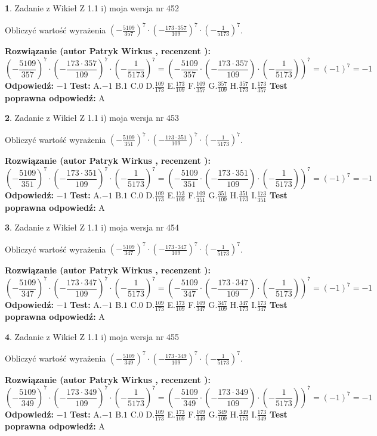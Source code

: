 \documentclass[12pt, a4paper]{article}
\theoremstyle{definition} %
\newtheorem{zad}{}
\newcommand{\zadStart}[1]{\begin{zad}#1\newline}
\newcommand{\zadStop}{\end{zad}}
\newcommand{\rozwStart}[2]{\noindent \textbf{Rozwiązanie (autor #1 , recenzent #2): }\newline}
\newcommand{\rozwStop}{\newline}
\newcommand{\odpStart}{\noindent \textbf{Odpowiedź:}\newline}
\newcommand{\odpStop}{\newline}
\newcommand{\testStart}{\noindent \textbf{Test:}\newline}
\newcommand{\testStop}{\newline}
\newcommand{\kluczStart}{\noindent \textbf{Test poprawna odpowiedź:}\newline}
\newcommand{\kluczStop}{\newline}
\begin{document}
\zadStart{Zadanie z Wikieł Z 1.1 i) moja wersja nr 452}

Obliczyć wartość wyrażenia $(-\frac{5109}{357})^{7} \cdot (-\frac{173 \cdot 357}{109})^{7} \cdot (-\frac{1}{5173})^{7}$.
\zadStop
\rozwStart{Patryk Wirkus}{}
$$(-\frac{5109}{357})^{7} \cdot (-\frac{173 \cdot 357}{109})^{7} \cdot (-\frac{1}{5173})^{7} = (-\frac{5109}{357} \cdot (-\frac{173 \cdot 357}{109}) \cdot (-\frac{1}{5173}))^{7} = (-1)^{7} = -1$$
\rozwStop
\odpStart
$-1$
\odpStop
\testStart
A.$-1$ B.$1$ C.$0$ D.$\frac{109}{173}$ E.$\frac{173}{109}$
F.$\frac{109}{357}$ G.$\frac{357}{109}$
H.$\frac{357}{173}$
I.$\frac{173}{357}$
\testStop
\kluczStart
A
\kluczStop



\zadStart{Zadanie z Wikieł Z 1.1 i) moja wersja nr 453}

Obliczyć wartość wyrażenia $(-\frac{5109}{351})^{7} \cdot (-\frac{173 \cdot 351}{109})^{7} \cdot (-\frac{1}{5173})^{7}$.
\zadStop
\rozwStart{Patryk Wirkus}{}
$$(-\frac{5109}{351})^{7} \cdot (-\frac{173 \cdot 351}{109})^{7} \cdot (-\frac{1}{5173})^{7} = (-\frac{5109}{351} \cdot (-\frac{173 \cdot 351}{109}) \cdot (-\frac{1}{5173}))^{7} = (-1)^{7} = -1$$
\rozwStop
\odpStart
$-1$
\odpStop
\testStart
A.$-1$ B.$1$ C.$0$ D.$\frac{109}{173}$ E.$\frac{173}{109}$
F.$\frac{109}{351}$ G.$\frac{351}{109}$
H.$\frac{351}{173}$
I.$\frac{173}{351}$
\testStop
\kluczStart
A
\kluczStop



\zadStart{Zadanie z Wikieł Z 1.1 i) moja wersja nr 454}

Obliczyć wartość wyrażenia $(-\frac{5109}{347})^{7} \cdot (-\frac{173 \cdot 347}{109})^{7} \cdot (-\frac{1}{5173})^{7}$.
\zadStop
\rozwStart{Patryk Wirkus}{}
$$(-\frac{5109}{347})^{7} \cdot (-\frac{173 \cdot 347}{109})^{7} \cdot (-\frac{1}{5173})^{7} = (-\frac{5109}{347} \cdot (-\frac{173 \cdot 347}{109}) \cdot (-\frac{1}{5173}))^{7} = (-1)^{7} = -1$$
\rozwStop
\odpStart
$-1$
\odpStop
\testStart
A.$-1$ B.$1$ C.$0$ D.$\frac{109}{173}$ E.$\frac{173}{109}$
F.$\frac{109}{347}$ G.$\frac{347}{109}$
H.$\frac{347}{173}$
I.$\frac{173}{347}$
\testStop
\kluczStart
A
\kluczStop



\zadStart{Zadanie z Wikieł Z 1.1 i) moja wersja nr 455}

Obliczyć wartość wyrażenia $(-\frac{5109}{349})^{7} \cdot (-\frac{173 \cdot 349}{109})^{7} \cdot (-\frac{1}{5173})^{7}$.
\zadStop
\rozwStart{Patryk Wirkus}{}
$$(-\frac{5109}{349})^{7} \cdot (-\frac{173 \cdot 349}{109})^{7} \cdot (-\frac{1}{5173})^{7} = (-\frac{5109}{349} \cdot (-\frac{173 \cdot 349}{109}) \cdot (-\frac{1}{5173}))^{7} = (-1)^{7} = -1$$
\rozwStop
\odpStart
$-1$
\odpStop
\testStart
A.$-1$ B.$1$ C.$0$ D.$\frac{109}{173}$ E.$\frac{173}{109}$
F.$\frac{109}{349}$ G.$\frac{349}{109}$
H.$\frac{349}{173}$
I.$\frac{173}{349}$
\testStop
\kluczStart
A
\kluczStop
\end{document}
